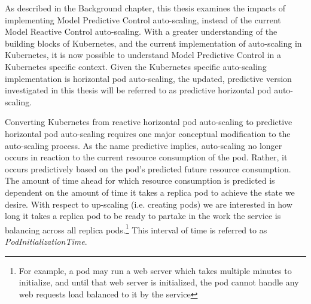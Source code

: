 As described in the Background chapter, this thesis examines the impacts of
implementing Model Predictive Control auto-scaling, instead of the current Model Reactive
Control auto-scaling. With a greater understanding of the building blocks of
Kubernetes, and the current implementation of auto-scaling in Kubernetes, it is
now possible to understand Model Predictive Control in a Kubernetes specific
context. Given the Kubernetes specific auto-scaling implementation is horizontal
pod auto-scaling, the updated, predictive version investigated in this thesis
will be referred to as predictive horizontal pod auto-scaling.

Converting Kubernetes from reactive horizontal pod auto-scaling to predictive
horizontal pod auto-scaling requires one major conceptual modification to the
auto-scaling process. As the name predictive implies, auto-scaling no longer
occurs in reaction to the current resource consumption of the pod. Rather, it occurs
predictively based on the pod's predicted future resource consumption. The
amount of time ahead for which resource consumption is predicted is dependent on
the amount of time it takes a replica pod to achieve the state we desire. With
respect to up-scaling (i.e. creating pods) we are interested in how long it
takes a replica pod to be ready to partake in the work the
service is balancing across all replica pods.\footnote{For example, a pod may
run a web server which takes multiple minutes to initialize, and until that web server
is initialized, the pod cannot handle any web requests load balanced to it by
the service} This interval of time is referred to as \textit{PodInitializationTime}.

